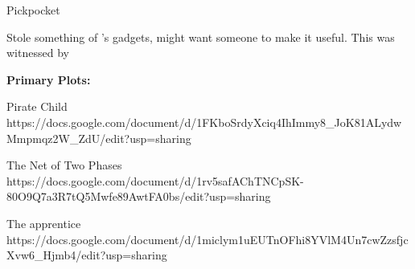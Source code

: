 \documentclass[char]{GL2020}
\begin{document}
\name{\cPirateChild{}}








Pickpocket

Stole something of \cChupInventor{}'s gadgets, might want someone to make it useful. This was witnessed by \cInterpol{}

\textbf{Primary Plots:}

Pirate Child https://docs.google.com/document/d/1FKboSrdyXciq4IhImmy8_JoK81ALydwMmpmqz2W_ZdU/edit?usp=sharing

The Net of Two Phases https://docs.google.com/document/d/1rv5safAChTNCpSK-80O9Q7a3R7tQ5Mwfe89AwtFA0bs/edit?usp=sharing

The apprentice https://docs.google.com/document/d/1miclym1uEUTnOFhi8YVlM4Un7cwZzsfjcXvw6_Hjmb4/edit?usp=sharing
\end{document}
